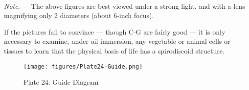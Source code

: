 \documentclass[a4paper, 12pt, oneside]{article}
\begin{document}
\paragraph{}
\emph{Note}. --- The above figures are best viewed under a strong light, and with a lens magnifying only 2 diameters (about 6-inch focus).

If the pictures fail to convince --- though C-G are fairly good --- it is only necessary to examine, under oil immersion, any vegetable or animal cells or tissues to learn that the physical basis of life has a spirodiscoid structure.
\clearpage
\begin{figure}[b]
\centering
\texttt{[image: figures/Plate24-Guide.png]}
\caption*{\small Plate 24: Guide Diagram}
\end{figure}
\clearpage
\pagestyle{plain}
\printindex
\clearpage
\end{document}
